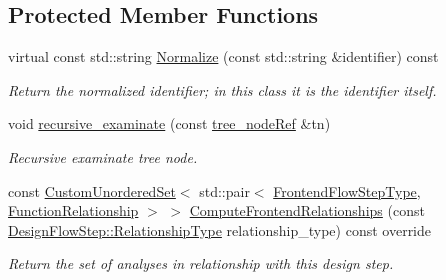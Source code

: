 \subsection*{Protected Member Functions}
\begin{DoxyCompactItemize}
\item 
virtual const std\+::string \hyperlink{classVarDeclFix_a20e7d8b00a37444085e46773a6483d3b}{Normalize} (const std\+::string \&identifier) const
\begin{DoxyCompactList}\small\item\em Return the normalized identifier; in this class it is the identifier itself. \end{DoxyCompactList}\item 
void \hyperlink{classVarDeclFix_a97f89fbe958790b6ae93d617e2b7686c}{recursive\+\_\+examinate} (const \hyperlink{tree__node_8hpp_a6ee377554d1c4871ad66a337eaa67fd5}{tree\+\_\+node\+Ref} \&tn)
\begin{DoxyCompactList}\small\item\em Recursive examinate tree node. \end{DoxyCompactList}\item 
const \hyperlink{classCustomUnorderedSet}{Custom\+Unordered\+Set}$<$ std\+::pair$<$ \hyperlink{frontend__flow__step_8hpp_afeb3716c693d2b2e4ed3e6d04c3b63bb}{Frontend\+Flow\+Step\+Type}, \hyperlink{classFrontendFlowStep_af7cf30f2023e5b99e637dc2058289ab0}{Function\+Relationship} $>$ $>$ \hyperlink{classVarDeclFix_a7262f23287cc6f446ab8de503ecac130}{Compute\+Frontend\+Relationships} (const \hyperlink{classDesignFlowStep_a723a3baf19ff2ceb77bc13e099d0b1b7}{Design\+Flow\+Step\+::\+Relationship\+Type} relationship\+\_\+type) const override
\begin{DoxyCompactList}\small\item\em Return the set of analyses in relationship with this design step. \end{DoxyCompactList}\end{DoxyCompactItemize}
